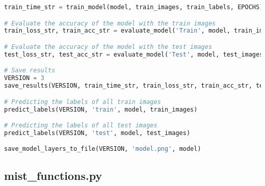 \begin{lstlisting}[language=python]
train_time_str = train_model(model, train_images, train_labels, EPOCHS)

# Evaluate the accuracy of the model with the train images
train_loss_str, train_acc_str = evaluate_model('Train', model, train_images, train_labels)

# Evaluate the accuracy of the model with the test images
test_loss_str, test_acc_str = evaluate_model('Test', model, test_images, test_labels)

# Save results
VERSION = 3
save_results(VERSION, train_time_str, train_loss_str, train_acc_str, test_loss_str, test_acc_str)

# Predicting the labels of all train images
predict_labels(VERSION, 'train', model, train_images)

# Predicting the labels of all test images
predict_labels(VERSION, 'test', model, test_images)

save_model_layers_to_file(VERSION, 'model.png', model)
\end{lstlisting}


\subsection{mist\_functions.py}

